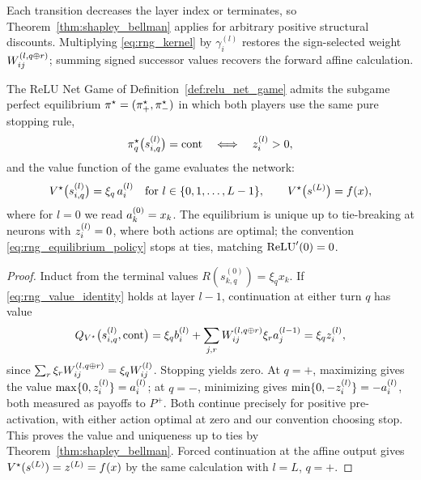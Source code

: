 Each transition decreases the layer index or terminates, so Theorem~\ref{thm:shapley_bellman} applies for arbitrary positive structural discounts. Multiplying \eqref{eq:rng_kernel} by $\gamma^{(l)}_i$ restores the sign-selected weight $W^{(l,q\oplus r)}_{ij}$; summing signed successor values recovers the forward affine calculation.

\begin{theoremenv}\label{thm:relu_net_game_value}
The ReLU Net Game of Definition~\ref{def:relu_net_game} admits the subgame perfect equilibrium $\pi^{\star} = (\pi^{\star}_{+}, \pi^{\star}_{-})$ in which both players use the same pure stopping rule,
\begin{equation}
	\pi^{\star}_{q}\bigl( s^{(l)}_{i,q} \bigr) = \mathrm{cont}
	\quad \Longleftrightarrow \quad
	z^{(l)}_i > 0,
	\label{eq:rng_equilibrium_policy}
\end{equation}
and the value function of the game evaluates the network:
\begin{equation}
	V^{\star}\bigl(s^{(l)}_{i,q}\bigr) = \xi_{q}\, a^{(l)}_i
	\quad \text{for } l \in \{0, 1, \ldots, L-1\},
	\qquad
	V^{\star}\bigl(s^{(L)}\bigr) = f(x),
	\label{eq:rng_value_identity}
\end{equation}
where for $l = 0$ we read $a^{(0)}_k = x_k$. The equilibrium is unique up to tie-breaking at neurons with $z^{(l)}_i = 0$, where both actions are optimal; the convention \eqref{eq:rng_equilibrium_policy} stops at ties, matching $\text{ReLU}'(0) = 0$.\end{theoremenv}

\begin{proof}
Induct from the terminal values $R(s^{(0)}_{k,q})=\xi_qx_k$. If \eqref{eq:rng_value_identity} holds at layer $l-1$, continuation at either turn $q$ has value
\begin{equation}
Q_{V^{\star}}\bigl(s^{(l)}_{i,q},\mathrm{cont}\bigr)
=\xi_q b^{(l)}_i+\sum_{j,r}W^{(l,q\oplus r)}_{ij}\xi_ra^{(l-1)}_j
=\xi_qz^{(l)}_i,
\label{eq:rng_cont_value}
\end{equation}
since $\sum_r\xi_rW^{(l,q\oplus r)}_{ij}=\xi_qW^{(l)}_{ij}$. Stopping yields zero. At $q=+$, maximizing gives the value $\max\{0,z^{(l)}_i\}=a^{(l)}_i$; at $q=-$, minimizing gives $\min\{0,-z^{(l)}_i\}=-a^{(l)}_i$, both measured as payoffs to $P^+$. Both continue precisely for positive pre-activation, with either action optimal at zero and our convention choosing stop. This proves the value and uniqueness up to ties by Theorem~\ref{thm:shapley_bellman}. Forced continuation at the affine output gives $V^{\star}(s^{(L)})=z^{(L)}=f(x)$ by the same calculation with $l=L$, $q=+$.
\end{proof}

